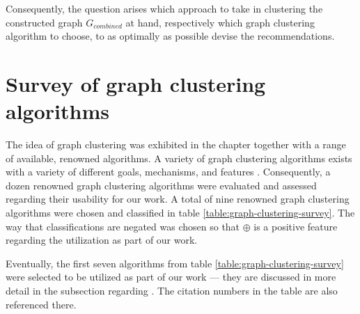 \documentclass[12pt,a4paper]{report}
\begin{document}
Consequently, the question arises which approach to take in clustering the
constructed graph \(G_{combined}\) at hand, respectively which graph clustering
algorithm to choose, to as optimally as possible devise the recommendations.



\section{Survey of graph clustering algorithms} \label{sect:graph-clustering-algorithm-survey}

The idea of graph clustering was exhibited in the \textit{}
chapter together with a range of available, renowned algorithms.
A variety of graph clustering algorithms exists with a variety of different
goals, mechanisms, and features
\cite{lancichinetti2009community, fortunato2010community, danon2005comparing}.
Consequently, a dozen renowned graph clustering algorithms were evaluated and
assessed regarding their usability for our work.
A total of nine renowned graph clustering algorithms were chosen and classified
in table \ref{table:graph-clustering-survey}.
The way that classifications are negated was chosen so that $\oplus$
is a positive feature regarding the utilization as part of our work.

Eventually, the first seven algorithms from table \ref{table:graph-clustering-survey}
were selected to be utilized as part of our work --- they are discussed
in more detail in the \textit{} subsection regarding
\textit{}.
The citation numbers in the table are also referenced there.
\end{document}
